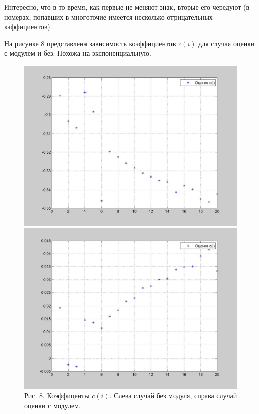 \documentclass[12pt]{report}
\begin{document}
Интересно, что в то время, как первые не меняют знак, вторые его чередуют (в номерах, попавших в многоточие имеется несколько отрицательных кэффициентов). 

На рисунке 8 представлена зависимость коэффициентов $c(i)$ для случая оценки с модулем и без. Похожа на экспоненциальную.
\begin{figure}[!ht]
\begin{center}
\includegraphics[scale=0.2]{CoefficientsEstimation20}
\includegraphics[scale=0.2]{CoefficientsEstimation20Fabs}
\\Рис. 8. Коэффиценты $c(i)$. Слева случай без модуля, справа случай оценки с модулем.
\end{center}
\end{figure}
\newpage
\end{document}
